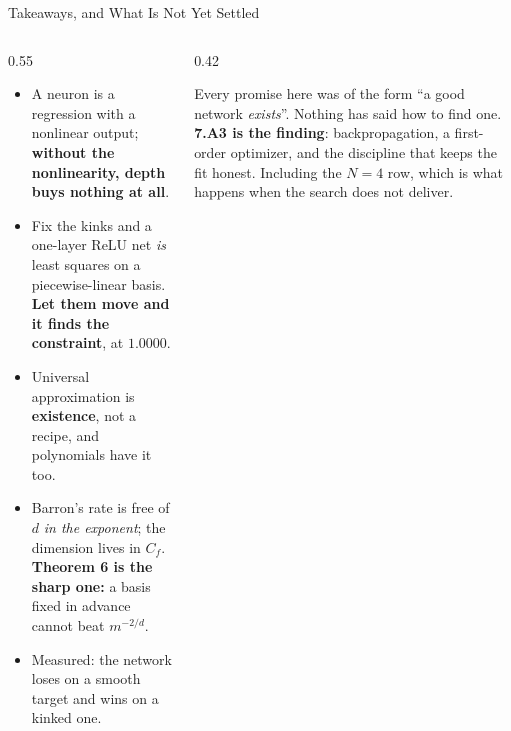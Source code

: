 \begin{frame}{Takeaways, and What Is Not Yet Settled}
\begin{columns}[T]
\begin{column}{0.55\textwidth}
\begin{takeawaybox}\small
\begin{itemize}\small\setlength{\itemsep}{1.1mm}
  \item A neuron is a regression with a nonlinear output; \textbf{without the nonlinearity, depth buys nothing at all}.
  \item Fix the kinks and a one-layer ReLU net \emph{is} least squares on a piecewise-linear basis. \textbf{Let them move and it finds the constraint}, at $1.0000$.
  \item Universal approximation is \textbf{existence}, not a recipe, and polynomials have it too.
  \item Barron's rate is free of $d$ \emph{in the exponent}; the dimension lives in $C_f$. \textbf{Theorem 6 is the sharp one:} a basis fixed in advance cannot beat $m^{-2/d}$.
  \item Measured: the network loses on a smooth target and wins on a kinked one.
\end{itemize}
\end{takeawaybox}
\end{column}
\begin{column}{0.42\textwidth}
\begin{conceptbox}[title=\textbf{Bridge to 7.A3}]\small
Every promise here was of the form ``a good network \emph{exists}''. Nothing has said how to find one.
\medskip
\textbf{7.A3 is the finding}: backpropagation, a first-order optimizer, and the discipline that keeps the fit honest. Including the $N=4$ row, which is what happens when the search does not deliver.
\end{conceptbox}
\end{column}
\end{columns}
\end{frame}


